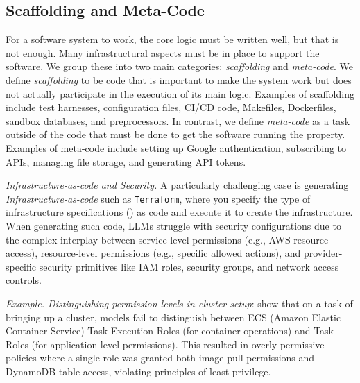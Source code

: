 






\subsection{Scaffolding and Meta-Code} \label{subsec:scaffolding-metacode}

For a software system to work, the core logic must be written well, but that is not enough. Many infrastructural aspects must be in place to support the software. We group these into two main categories: \textit{scaffolding} and \textit{meta-code}. We define \textit{scaffolding} to be code that is important to make the system work but does not actually participate in the execution of its main logic. Examples of scaffolding include test harnesses, configuration files, CI/CD code, Makefiles, Dockerfiles, sandbox databases, and preprocessors. In contrast, we define \textit{meta-code} as a task outside of the code that must be done to get the software running the property. Examples of meta-code include setting up Google authentication, subscribing to APIs, managing file storage, and generating API tokens.

\textit{Infrastructure-as-code and Security.} A particularly challenging case is generating \textit{Infrastructure-as-code} such as \texttt{Terraform}, where you specify the type of infrastructure specifications () as code and execute it to create the infrastructure. When generating such code, LLMs struggle with security configurations due to the complex interplay between service-level permissions (e.g., AWS resource access), resource-level permissions (e.g., specific allowed actions), and provider-specific security primitives like IAM roles, security groups, and network access controls.

\begin{tcolorbox}[colback=lightblue, boxrule=0pt, arc=10pt, outer arc=10pt]
\textit{Example. Distinguishing permission levels in cluster setup}: \cite{terrateam2024} show that on a task of bringing up a cluster, models fail to distinguish between ECS (Amazon Elastic Container Service) Task Execution Roles (for container operations) and Task Roles (for application-level permissions). This resulted in overly permissive policies where a single role was granted both image pull permissions and DynamoDB table access, violating principles of least privilege.
\end{tcolorbox}

